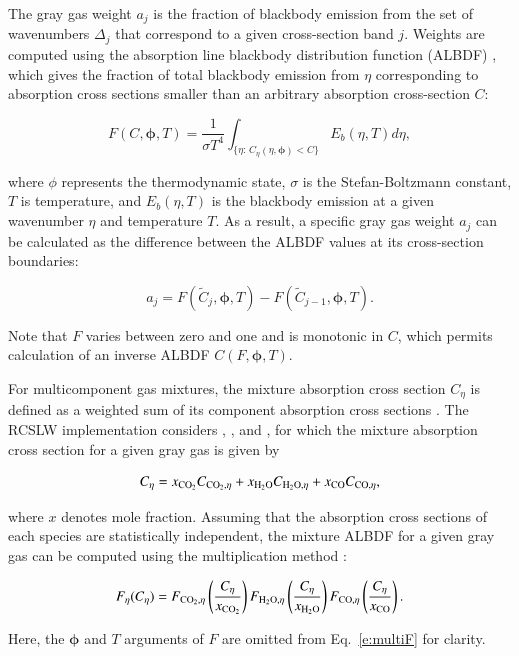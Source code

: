 \documentclass[preprint,12pt]{elsarticle}
\newcommand{\BS}{\boldsymbol}
\newcounter{bla}
\begin{document}
The gray gas weight $a_j$ is the fraction of blackbody emission from the set of wavenumbers $\Delta_j$ that correspond to a given cross-section band $j$. Weights are computed using the absorption line blackbody distribution function (ALBDF) \cite{Pearson_2014}, which gives the fraction of total blackbody emission from $\eta$ corresponding to absorption cross sections smaller than an arbitrary absorption cross-section $C$: 
%
\begin{linenomath}
    \begin{equation} \label{e:albdf}
        F(C,\BS{\phi},T) = \frac{1}{\sigma T^4}\int_{\{\eta:\,C_\eta(\eta,\BS{\phi})<C\}}E_b(\eta,T)d\eta,
\end{equation}
\end{linenomath}
%
where $\phi$ represents the thermodynamic state, $\sigma$ is the Stefan-Boltzmann constant, $T$ is temperature, and $E_b(\eta,T)$ is the blackbody emission at a given wavenumber $\eta$ and temperature $T$.
As a result, a specific gray gas weight $a_j$ can be calculated as the difference between the ALBDF values at its cross-section boundaries:
%
\begin{linenomath}
    \begin{equation}\label{e:aj}
    a_j = F(\tilde{C}_j,\BS{\phi}, T) - F(\tilde{C}_{j-1}, \BS{\phi},T).
\end{equation}
\end{linenomath}
%
Note that $F$ varies between zero and one and is monotonic in $C$, which permits calculation of an inverse ALBDF $C(F,\BS{\phi},T)$.

For multicomponent gas mixtures, the mixture absorption cross section $C_{\eta}$ is defined as a weighted sum of its component absorption cross sections \cite{Solovjov_2000}. The RCSLW implementation considers , , and , for which the mixture absorption cross section for a given gray gas is given by 
%
\begin{linenomath}
	\begin{equation} \label{e:multiC}
		C_{\eta} = x_{\ce{CO2}}C_{\ce{CO2},\eta} + x_{\ce{H2O}}C_{\ce{H2O},\eta} + x_{\ce{CO}}C_{\ce{CO},\eta},
	\end{equation}
\end{linenomath}
%
where $x$ denotes mole fraction.
Assuming that the absorption cross sections of each species are statistically independent, the mixture ALBDF for a given gray gas can be computed using the multiplication method \cite{Solovjov_2000}:
%
\begin{linenomath}
\begin{equation} \label{e:multiF}
    F_{\eta}(C_{\eta}) = F_{\ce{CO2},\eta} \left( \frac{C_{\eta}}{x_{\ce{CO2}}} \right) F_{\ce{H2O},\eta} \left( \frac{C_{\eta}}{x_{\ce{H2O}}} \right) F_{\ce{CO},\eta} \left( \frac{C_{\eta}}{x_{\ce{CO}}} \right). 
\end{equation}
\end{linenomath}
%
Here, the $\BS{\phi}$ and $T$ arguments of $F$ are omitted from Eq.~\ref{e:multiF} for clarity.
\end{document}
